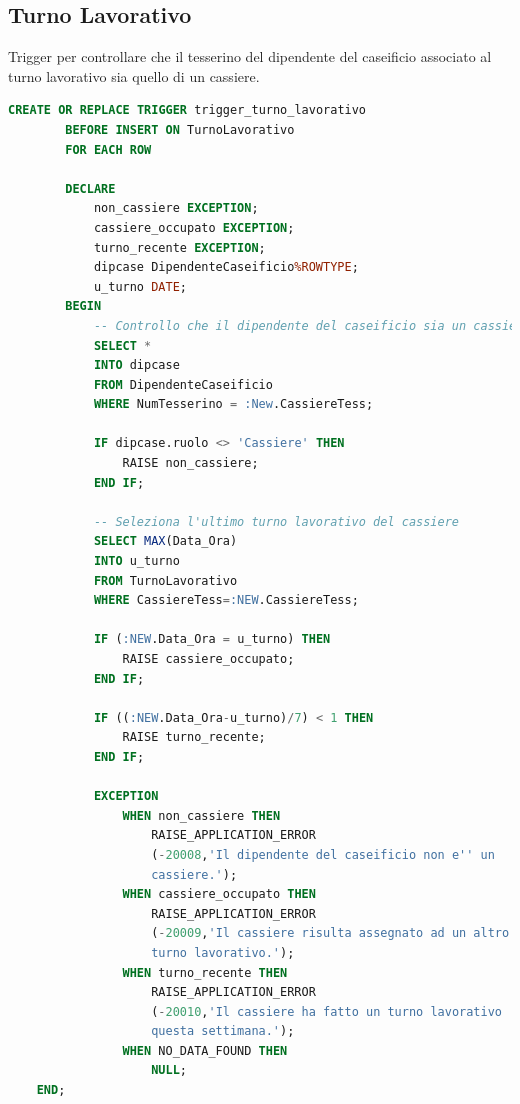 \documentclass[12pt]{report}
\begin{document}
\subsection*{Turno Lavorativo}
Trigger per controllare che il tesserino del dipendente del caseificio associato al turno lavorativo sia quello di un cassiere. 
\begin{lstlisting}[language=SQL,caption={TR\_TURNO\_LAVORATIVO}]
    CREATE OR REPLACE TRIGGER trigger_turno_lavorativo
		BEFORE INSERT ON TurnoLavorativo
		FOR EACH ROW

		DECLARE 
			non_cassiere EXCEPTION;
			cassiere_occupato EXCEPTION;
			turno_recente EXCEPTION;
			dipcase DipendenteCaseificio%ROWTYPE;
			u_turno DATE;
		BEGIN
			-- Controllo che il dipendente del caseificio sia un cassiere
			SELECT *
			INTO dipcase
			FROM DipendenteCaseificio
			WHERE NumTesserino = :New.CassiereTess;
	
			IF dipcase.ruolo <> 'Cassiere' THEN
				RAISE non_cassiere;
			END IF;
		
			-- Seleziona l'ultimo turno lavorativo del cassiere
			SELECT MAX(Data_Ora)
			INTO u_turno
			FROM TurnoLavorativo
			WHERE CassiereTess=:NEW.CassiereTess;

			IF (:NEW.Data_Ora = u_turno) THEN
				RAISE cassiere_occupato;
			END IF;

			IF ((:NEW.Data_Ora-u_turno)/7) < 1 THEN
				RAISE turno_recente;
			END IF;

			EXCEPTION
				WHEN non_cassiere THEN
					RAISE_APPLICATION_ERROR
					(-20008,'Il dipendente del caseificio non e'' un 
					cassiere.');
				WHEN cassiere_occupato THEN
					RAISE_APPLICATION_ERROR
					(-20009,'Il cassiere risulta assegnato ad un altro 
					turno lavorativo.');
				WHEN turno_recente THEN
					RAISE_APPLICATION_ERROR
					(-20010,'Il cassiere ha fatto un turno lavorativo 
					questa settimana.');
				WHEN NO_DATA_FOUND THEN
					NULL;
	END;
\end{lstlisting}
\end{document}
